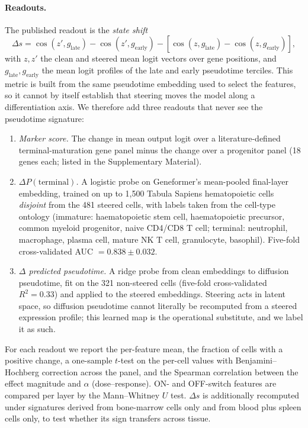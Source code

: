 \documentclass[11pt,onecolumn]{article}
\begin{document}
\paragraph{Readouts.}
The published readout is the \emph{state shift}
\[
\Delta s = \cos(z', g_\text{late}) - \cos(z', g_\text{early}) - [\cos(z, g_\text{late}) - \cos(z, g_\text{early})],
\]
with $z, z'$ the clean and steered mean logit vectors over gene positions, and $g_\text{late}, g_\text{early}$ the mean logit profiles of the late and early pseudotime terciles. This metric is built from the same pseudotime embedding used to select the features, so it cannot by itself establish that steering moves the model along a differentiation axis. We therefore add three readouts that never see the pseudotime signature:
\begin{enumerate}
\item \emph{Marker score.} The change in mean output logit over a literature-defined terminal-maturation gene panel minus the change over a progenitor panel (18 genes each; listed in the Supplementary Material).
\item \emph{$\Delta P(\text{terminal})$.} A logistic probe on Geneformer's mean-pooled final-layer embedding, trained on up to 1{,}500 Tabula Sapiens hematopoietic cells \emph{disjoint} from the 481 steered cells, with labels taken from the cell-type ontology (immature: haematopoietic stem cell, haematopoietic precursor, common myeloid progenitor, naive CD4/CD8 T cell; terminal: neutrophil, macrophage, plasma cell, mature NK T cell, granulocyte, basophil). Five-fold cross-validated AUC $=0.838\pm0.032$.
\item \emph{$\Delta$ predicted pseudotime.} A ridge probe from clean embeddings to diffusion pseudotime, fit on the 321 non-steered cells (five-fold cross-validated $R^2=0.33$) and applied to the steered embeddings. Steering acts in latent space, so diffusion pseudotime cannot literally be recomputed from a steered expression profile; this learned map is the operational substitute, and we label it as such.
\end{enumerate}
For each readout we report the per-feature mean, the fraction of cells with a positive change, a one-sample $t$-test on the per-cell values with Benjamini--Hochberg correction across the panel, and the Spearman correlation between the effect magnitude and $\alpha$ (dose--response). ON- and OFF-switch features are compared per layer by the Mann--Whitney $U$ test. $\Delta s$ is additionally recomputed under signatures derived from bone-marrow cells only and from blood plus spleen cells only, to test whether its sign transfers across tissue.
\end{document}
